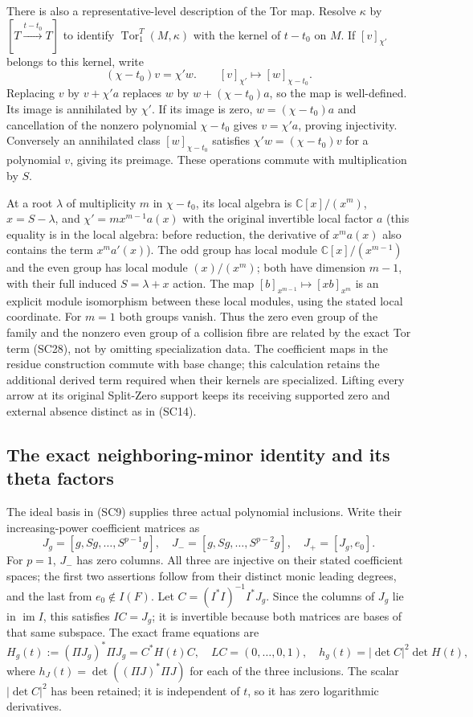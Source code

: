 \documentclass{article}
\begin{document}
There is also a representative-level description of the Tor map.
Resolve $\kappa$ by $[T\xrightarrow{t-t_0}T]$ to identify
$\operatorname{Tor}_1^T(M,\kappa)$ with the kernel of $t-t_0$ on
$M$.  If $[v]_{\chi'}$ belongs to this kernel, write
\[
  (\chi-t_0)v=\chi'w.
  \qquad [v]_{\chi'}\longmapsto[w]_{\chi-t_0}.
 \tag{SC30}
\]
Replacing $v$ by $v+\chi'a$ replaces $w$ by $w+(\chi-t_0)a$,
so the map is well-defined.  Its image is annihilated by $\chi'$.
If its image is zero, $w=(\chi-t_0)a$ and cancellation of the
nonzero polynomial $\chi-t_0$ gives $v=\chi'a$, proving
injectivity.  Conversely an annihilated class $[w]_{\chi-t_0}$
satisfies $\chi'w=(\chi-t_0)v$ for a polynomial $v$, giving its
preimage.  These operations commute with multiplication by $S$.

At a root $\lambda$ of multiplicity $m$ in $\chi-t_0$, its local
algebra is $\mathbb C[x]/(x^m)$, $x=S-\lambda$, and
$\chi'=m x^{m-1}a(x)$ with the original invertible local factor
$a$ (this equality is in the local algebra: before reduction,
the derivative of $x^ma(x)$ also contains the term $x^ma'(x)$).
The odd group has local module
$\mathbb C[x]/(x^{m-1})$ and the even group has local module
$(x)/(x^m)$; both have dimension $m-1$, with their full induced
$S=\lambda+x$ action.  The map
$[b]_{x^{m-1}}\mapsto[xb]_{x^m}$ is an explicit module isomorphism
between these local modules, using the stated local coordinate.
For $m=1$ both groups vanish.
Thus the zero even group of the family and the nonzero even group
of a collision fibre are related by the exact Tor term (SC28),
not by omitting specialization data.  The coefficient maps in
the residue construction commute with base change; this calculation
retains the additional derived term required when their kernels
are specialized.  Lifting every arrow at its original Split-Zero
support keeps its receiving supported zero and external absence
distinct as in (SC14).

\subsection{The exact neighboring-minor identity and its theta factors}

The ideal basis in (SC9) supplies three actual polynomial inclusions.
Write their increasing-power coefficient matrices as
\[
 J_g=[g,Sg,\ldots,S^{p-1}g],\quad
 J_-=[g,Sg,\ldots,S^{p-2}g],\quad
 J_+=[J_g,e_0].
 \tag{SC31}
\]
For $p=1$, $J_-$ has zero columns.  All three are injective on their
stated coefficient spaces; the first two assertions follow from
their distinct monic leading degrees, and the last from
$e_0\notin I(F)$.  Let
$C=(I^*I)^{-1}I^*J_g$.  Since the columns of $J_g$ lie in
$\operatorname{im}I$, this satisfies $IC=J_g$; it is invertible
because both matrices are bases of that same subspace.  The exact
frame equations are
\[
 H_g(t):=(\Pi J_g)^*\Pi J_g=C^*H(t)C,
 \quad LC=(0,\ldots,0,1),\quad
 h_g(t)=|\det C|^2\det H(t),
 \tag{SC32}
\]
where $h_J(t)=\det((\Pi J)^*\Pi J)$ for each of the three
inclusions.  The scalar $|\det C|^2$ has been retained; it is
independent of $t$, so it has zero logarithmic derivatives.
\end{document}
